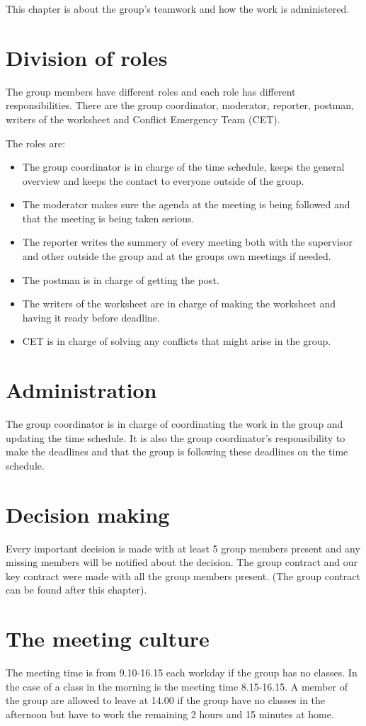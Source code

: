 This chapter is about the group's teamwork and how the work is administered.
\section{Division of roles}
The group members have different roles and each role has different responsibilities. There are the group coordinator, moderator, reporter, postman, writers of the worksheet and Conflict Emergency Team (CET).

The roles are:
\begin{itemize}
\item The group coordinator is in charge of the time schedule, keeps the general overview and keeps the contact to everyone outside of the group.
\item The moderator makes sure the agenda at the meeting is being followed and that the meeting is being taken serious.
\item The reporter writes the summery of every meeting both with the supervisor and other outside the group and at the groups own meetings if needed.
\item The postman is in charge of getting the post.
\item The writers of the worksheet are in charge of making the worksheet and having it ready before deadline.
\item CET is in charge of solving any conflicts that might arise in the group.
\end{itemize}

\section{Administration}
The group coordinator is in charge of coordinating the work in the group and updating the time schedule. It is also the group coordinator's responsibility to make the deadlines and that the group is following these deadlines on the time schedule.
\section{Decision making}
Every important decision is made with at least 5 group members present and any missing members will be notified about the decision. The group contract and our key contract were made with all the group members present. (The group contract can be found after this chapter).
\section{The meeting culture}
The meeting time is from 9.10-16.15 each workday if the group has no classes. In the case of a class in the morning is the meeting time 8.15-16.15.
A member of the group are allowed to leave at 14.00 if the group have no classes in the afternoon but have to work the remaining 2 hours and 15 minutes at home.
